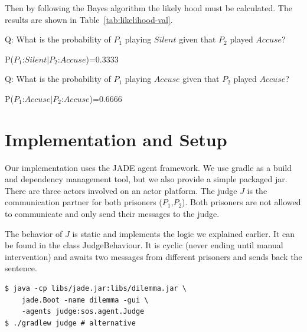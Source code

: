 \documentclass{acm_proc_article-sp}
\begin{document}
Then by following the Bayes algorithm the likely hood must be calculated. The results
are shown in Table~\ref{tab:likelihood-val}.

Q: What is the probability of $P_1$ playing $Silent$ given that $P_2$ played $Accuse$? 
\begin{center} 
P($P_1$:$Silent$$|$$P_2$:$Accuse$)=0.3333
\end{center}

Q: What is the probability of $P_1$ playing $Accuse$ given that $P_2$ played $Accuse$? 
\begin{center} 
P($P_1$:$Accuse$$|$$P_2$:$Accuse$)=0.6666
\end{center}

\section{Implementation and Setup}

Our implementation uses the JADE agent framework. We use gradle as a build and dependency management tool, but we also provide a simple packaged jar. There are three actors
involved on an actor platform. The judge $J$ is the communication partner for both
prisoners ($P_1$,$P_2$). Both prisoners are not allowed to communicate and only
send their messages to the judge.

The behavior of $J$ is static and implements the logic we explained earlier. It can be
found in the class JudgeBehaviour. It is cyclic (never ending until manual intervention) and awaits two messages from different prisoners and sends back the sentence.

\begin{lstlisting}
$ java -cp libs/jade.jar:libs/dilemma.jar \
    jade.Boot -name dilemma -gui \
    -agents judge:sos.agent.Judge
$ ./gradlew judge # alternative
\end{lstlisting}
\end{document}
